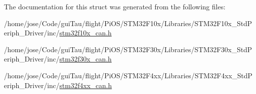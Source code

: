 The documentation for this struct was generated from the following files\-:\begin{DoxyCompactItemize}
\item 
/home/jose/\-Code/gui\-Tau/flight/\-Pi\-O\-S/\-S\-T\-M32\-F10x/\-Libraries/\-S\-T\-M32\-F10x\-\_\-\-Std\-Periph\-\_\-\-Driver/inc/\hyperlink{stm32f10x__can_8h}{stm32f10x\-\_\-can.\-h}\item 
/home/jose/\-Code/gui\-Tau/flight/\-Pi\-O\-S/\-S\-T\-M32\-F30x/\-Libraries/\-S\-T\-M32\-F30x\-\_\-\-Std\-Periph\-\_\-\-Driver/inc/\hyperlink{stm32f30x__can_8h}{stm32f30x\-\_\-can.\-h}\item 
/home/jose/\-Code/gui\-Tau/flight/\-Pi\-O\-S/\-S\-T\-M32\-F4xx/\-Libraries/\-S\-T\-M32\-F4xx\-\_\-\-Std\-Periph\-\_\-\-Driver/inc/\hyperlink{stm32f4xx__can_8h}{stm32f4xx\-\_\-can.\-h}\end{DoxyCompactItemize}
